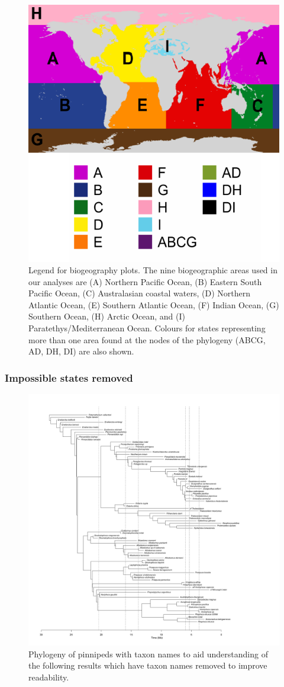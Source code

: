 \documentclass[a4paper, 12pt]{article}
\begin{document}
\begin{figure}[H]
 \centering
  \includegraphics[width = 0.5\linewidth]{figures/BGB-legend.pdf}
  \caption{Legend for biogeography plots. The nine biogeographic areas used in our analyses are (A) Northern Pacific Ocean, (B) Eastern South Pacific Ocean, (C) Australasian coastal waters, (D) Northern Atlantic Ocean, (E) Southern Atlantic Ocean, (F) Indian Ocean, (G) Southern Ocean, (H) Arctic Ocean, and (I) Paratethys/Mediterranean Ocean. Colours for states representing more than one area found at the nodes of the phylogeny (ABCG, AD, DH, DI) are also shown.}
  \label{fig-legend}
\end{figure} 

\subsubsection{Impossible states removed}

\begin{figure}[H]
 \centering
  \includegraphics[width = \linewidth]{figures/all-pinnipeds-tree.png}
  \caption{Phylogeny of pinnipeds with taxon names to aid understanding of the following results which have taxon names removed to improve readability.}
  \label{fig-all-tree}
\end{figure} 
\end{document}
